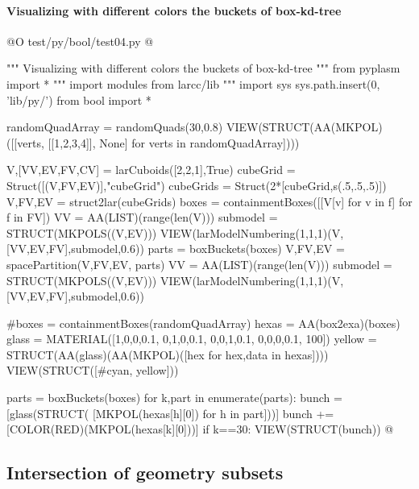 \documentclass[11pt,oneside]{article}    %
\begin{document}
\paragraph{Visualizing with different colors the buckets of box-kd-tree}
@O test/py/bool/test04.py @{
""" Visualizing with different colors the buckets of box-kd-tree """
from pyplasm import *
""" import modules from larcc/lib """
import sys
sys.path.insert(0, 'lib/py/')
from bool import *

randomQuadArray = randomQuads(30,0.8)
VIEW(STRUCT(AA(MKPOL)([[verts, [[1,2,3,4]], None] for verts in randomQuadArray])))


V,[VV,EV,FV,CV] = larCuboids([2,2,1],True)
cubeGrid = Struct([(V,FV,EV)],"cubeGrid")
cubeGrids = Struct(2*[cubeGrid,s(.5,.5,.5)])
V,FV,EV = struct2lar(cubeGrids)
boxes = containmentBoxes([[V[v] for v in f] for f in FV])
VV = AA(LIST)(range(len(V)))
submodel = STRUCT(MKPOLS((V,EV)))
VIEW(larModelNumbering(1,1,1)(V,[VV,EV,FV],submodel,0.6)) 
parts = boxBuckets(boxes)
V,FV,EV = spacePartition(V,FV,EV, parts)
VV = AA(LIST)(range(len(V)))
submodel = STRUCT(MKPOLS((V,EV)))
VIEW(larModelNumbering(1,1,1)(V,[VV,EV,FV],submodel,0.6)) 


#boxes = containmentBoxes(randomQuadArray)
hexas = AA(box2exa)(boxes)
glass = MATERIAL([1,0,0,0.1,  0,1,0,0.1,  0,0,1,0.1, 0,0,0,0.1, 100])
yellow = STRUCT(AA(glass)(AA(MKPOL)([hex for hex,data in hexas])))
VIEW(STRUCT([#cyan,
    yellow]))

parts = boxBuckets(boxes)
for k,part in enumerate(parts):
    bunch = [glass(STRUCT( [MKPOL(hexas[h][0]) for h in part]))]
    bunch += [COLOR(RED)(MKPOL(hexas[k][0]))]
    if k==30: VIEW(STRUCT(bunch))
@}


\subsection{Intersection of geometry subsets}
\end{document}
